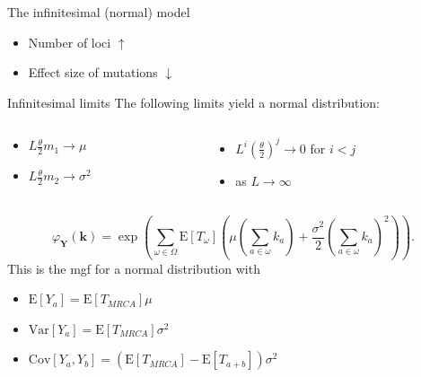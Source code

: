 \documentclass{beamer}
\newcommand{\T}{\frac{\theta}{2}}
\newcommand{\E}{\mathrm{E}}
\newcommand{\Var}{\mathrm{Var}}
\newcommand{\Cov}{\mathrm{Cov}}
\begin{document}
\begin{frame}{The infinitesimal (normal) model}
  \begin{itemize}
  \item Number of loci $\uparrow$
  \item Effect size of mutations $\downarrow$
  \end{itemize}
  \begin{block}{Infinitesimal limits}
    The following limits yield a normal distribution:
    \begin{columns}
      \begin{column}{.47\columnwidth}
        \begin{itemize}
        \item $L\T m_1 \to \mu$
        \item $L\T m_2\to \sigma^2$
        \end{itemize}
      \end{column}
      \begin{column}{.47\columnwidth}
        \begin{itemize}
        \item $L^i\left(\T\right)^j \to 0$ for $i<j$
        \item as $L \to \infty$
        \end{itemize}
      \end{column}
    \end{columns}
    \begin{equation*}
      \varphi_{\mathbf{Y}}(\mathbf{k}) = \exp \left( \sum_{\omega \in \Omega}\E[T_{\omega}] \left( \mu \left(
      \sum_{a \in \omega} k_a\right) + \frac{\sigma^2}{2}\left( \sum_{a \in \omega}
      k_a\right)^2\right)\right).
    \end{equation*}
    This is the mgf for a normal distribution with
    \begin{itemize}
    \item $\E[Y_a] = \E[T_{MRCA}] \mu$
    \item $\Var[Y_a] = \E[T_{MRCA}]\sigma^2$
    \item $\Cov[Y_a,Y_b] = (\E[T_{MRCA}] - \E[T_{a+b}]) \sigma^2$
    \end{itemize}
  \end{block}
\end{frame}
\end{document}
